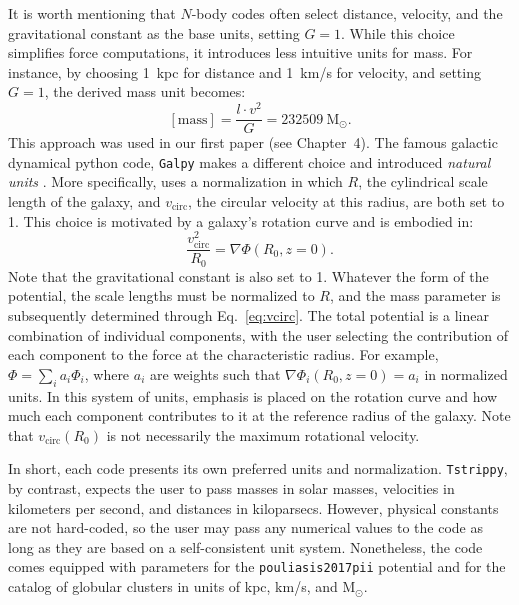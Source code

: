     It is worth mentioning that $N$-body codes often select distance, velocity, and the gravitational constant as the base units, setting $G = 1$. While this choice simplifies force computations, it introduces less intuitive units for mass. For instance, by choosing 1~kpc for distance and 1~km/s for velocity, and setting $G = 1$, the derived mass unit becomes:
    \begin{equation}
        \left[\mathrm{mass}\right] = \frac{l \cdot v^2}{G} = 232509~\mathrm{M}_\odot.
    \end{equation} This approach was used in our first paper (see Chapter~4). 
    The famous galactic dynamical python code, \texttt{Galpy} makes a different choice and introduced \textit{natural units} \citep{2015ApJS..216...29B}. More specifically, \citet{2015ApJS..216...29B} uses a normalization in which $R$, the cylindrical scale length of the galaxy, and $v_\mathrm{circ}$, the circular velocity at this radius, are both set to 1. This choice is motivated by a galaxy's rotation curve and is embodied in:
    \begin{equation}
        \frac{v_\mathrm{circ}^2}{R_0} = \nabla  \Phi \left(R_0, z=0\right).
        \label{eq:vcirc}
    \end{equation}
    Note that the gravitational constant is also set to 1. Whatever the form of the potential, the scale lengths must be normalized to $R$, and the mass parameter is subsequently determined through Eq.~\ref{eq:vcirc}. The total potential is a linear combination of individual components, with the user selecting the contribution of each component to the force at the characteristic radius. For example, $\Phi = \sum_i a_i\Phi_i$, where $a_i$ are weights such that $\nabla \Phi_i(R_0, z=0) = a_i$ in normalized units. In this system of units, emphasis is placed on the rotation curve and how much each component contributes to it at the reference radius of the galaxy. Note that $v_\mathrm{circ}(R_0)$ is not necessarily the maximum rotational velocity.

    In short, each code presents its own preferred units and normalization. \texttt{Tstrippy}, by contrast, expects the user to pass masses in solar masses, velocities in kilometers per second, and distances in kiloparsecs. However, physical constants are not hard-coded, so the user may pass any numerical values to the code as long as they are based on a self-consistent unit system. Nonetheless, the code comes equipped with parameters for the \texttt{pouliasis2017pii} potential \citep{2017A&A...598A..66P} and for the catalog of globular clusters \citep{2018MNRAS.478.1520B} in units of kpc, km/s, and $\mathrm{M}_\odot$.

